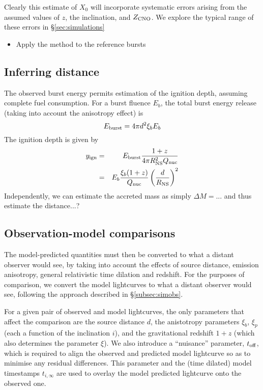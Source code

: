 \documentclass{aastex61}
\begin{document}
Clearly this estimate of $X_0$ will incorporate systematic errors arising from the assumed values of $z$, the inclination, and $Z_{\rm CNO}$. We explore the typical range of these errors in 
\S\ref{sec:simulations}

\begin{itemize}
\item Apply the method to the reference bursts
\end{itemize}


\subsection{Inferring distance} 
\label{subsec:distance}

The observed burst energy permits estimation of the ignition depth, assuming complete fuel consumption. For a burst fluence $E_b$, the total burst energy release (taking into account the anisotropy effect) is
\begin{equation}
E_{\rm burst} = 4\pi d^2 \xi_b E_b 
\end{equation}
The ignition depth is given by 
\begin{eqnarray}
y_{\rm ign} & = & E_{\rm burst}\frac{1 + z}{4\pi R_{\rm NS}^2 Q_{\rm nuc}} \\
  & = & E_b \frac{\xi_b (1 + z)}{ Q_{\rm nuc}} \left(\frac{d}{R_{\rm NS}}\right)^2 
\end{eqnarray}
Independently, we can estimate the accreted mass as simply $\Delta M = ...$ and thus estimate the distance...?

\subsection{Observation-model comparisons} 
\label{subsec:lccompare}

The model-predicted quantities must then be converted to what a distant observer would see, by taking into account the effects of source distance, emission anisotropy, general relativistic time dilation and redshift. For the purposes of comparison, we convert the model lightcurves to what a distant observer would see, following the approach described in \S\ref{subsec:simobs}.


For a given pair of observed and model lightcurves, the only parameters that affect the comparison are the source distance $d$, the anistotropy parameters $\xi_b$, $\xi_p$ (each a function of the inclination $i$), and the gravitational redshift $1+z$ (which also determines the parameter $\xi$).
%
We also introduce a ``nuisance'' parameter, $t_{\rm off}$, which is required to align the observed and predicted model lightcurve so as to minimise any residual differences. This parameter and the (time dilated) model timestamps $t_{i,\infty}$ are used to overlay the model predicted lightcurve onto the observed one.
\end{document}
